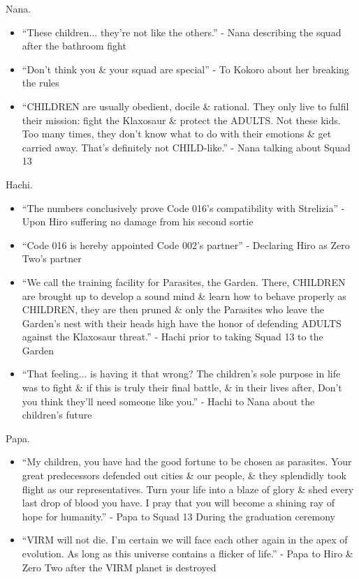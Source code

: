\documentclass{article}
\begin{document}
\begin{enumerate}
    {\sc Nana.}
    \begin{itemize}
    	\item ``These children... they're not like the others.'' - Nana describing the squad after the bathroom fight
    	\item ``Don't think you \& your squad are special'' - To Kokoro about her breaking the rules
    	\item ``CHILDREN are usually obedient, docile \& rational. They only live to fulfil their mission: fight the Klaxosaur \& protect the ADULTS. Not these kids. Too many times, they don't know what to do with their emotions \& get carried away. That's definitely not CHILD-like.'' - Nana talking about Squad 13 
    \end{itemize}
    {\sc Hachi.}
    \begin{itemize}
    	\item ``The numbers conclusively prove Code 016's compatibility with Strelizia'' - Upon Hiro suffering no damage from his second sortie
    	\item ``Code 016 is hereby appointed Code 002's partner'' - Declaring Hiro as Zero Two's partner
    	\item ``We call the training facility for Parasites, the Garden. There, CHILDREN are brought up to develop a sound mind \& learn how to behave properly as CHILDREN, they are then pruned \& only the Parasites who leave the Garden's nest with their heads high have the honor of defending ADULTS against the Klaxosaur threat.'' - Hachi prior to taking Squad 13 to the Garden
    	\item ``That feeling... is having it that wrong? The children's sole purpose in life was to fight \& if this is truly their final battle, \& in their lives after, Don't you think they'll need someone like you.'' - Hachi to Nana about the children's future
    \end{itemize}
    {\sc Papa.}
    \begin{itemize}
    	\item ``My children, you have had the good fortune to be chosen as parasites. Your great predecessors defended out cities \& our people, \& they splendidly took flight as our representatives. Turn your life into a blaze of glory \& shed every last drop of blood you have. I pray that you will become a shining ray of hope for humanity.'' - Papa to Squad 13 During the graduation ceremony
    	\item ``VIRM will not die. I'm certain we will face each other again in the apex of evolution. As long as this universe contains a flicker of life.'' - Papa to Hiro \& Zero Two after the VIRM planet is destroyed

\end{itemize}
\end{enumerate}
\end{document}
